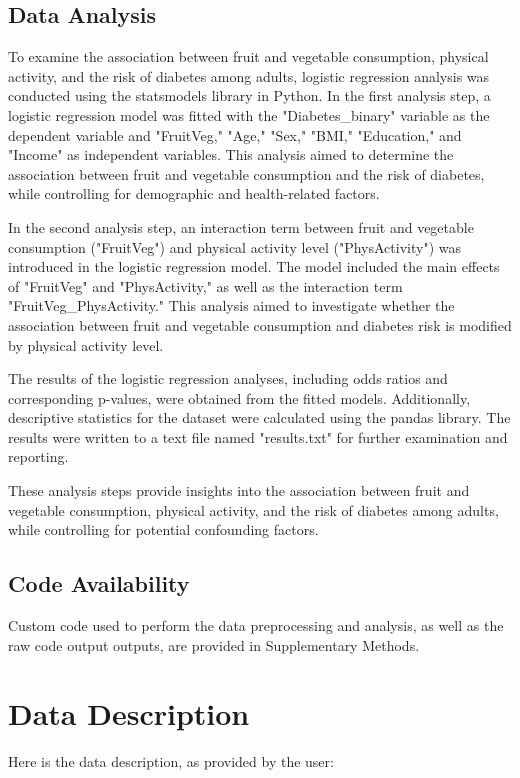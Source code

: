 \documentclass[11pt]{article}
\begin{document}
\subsection*{Data Analysis}
To examine the association between fruit and vegetable consumption, physical activity, and the risk of diabetes among adults, logistic regression analysis was conducted using the statsmodels library in Python. In the first analysis step, a logistic regression model was fitted with the "Diabetes\_binary" variable as the dependent variable and "FruitVeg," "Age," "Sex," "BMI," "Education," and "Income" as independent variables. This analysis aimed to determine the association between fruit and vegetable consumption and the risk of diabetes, while controlling for demographic and health-related factors.

In the second analysis step, an interaction term between fruit and vegetable consumption ("FruitVeg") and physical activity level ("PhysActivity") was introduced in the logistic regression model. The model included the main effects of "FruitVeg" and "PhysActivity," as well as the interaction term "FruitVeg\_PhysActivity." This analysis aimed to investigate whether the association between fruit and vegetable consumption and diabetes risk is modified by physical activity level.

The results of the logistic regression analyses, including odds ratios and corresponding p-values, were obtained from the fitted models. Additionally, descriptive statistics for the dataset were calculated using the pandas library. The results were written to a text file named "results.txt" for further examination and reporting. 

These analysis steps provide insights into the association between fruit and vegetable consumption, physical activity, and the risk of diabetes among adults, while controlling for potential confounding factors.\subsection*{Code Availability}

Custom code used to perform the data preprocessing and analysis, as well as the raw code output outputs, are provided in Supplementary Methods.




\clearpage
\appendix
\section*{Data Description} \label{sec:data_description} Here is the data description, as provided by the user:
\end{document}

